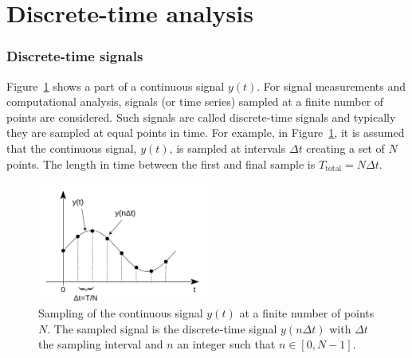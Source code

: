 \section{Discrete-time analysis}\label{app:discrete_time_analysis}

\subsubsection*{Discrete-time signals} %
Figure~\ref{fig:sampling_of_continuous_signal} shows a part of a continuous signal $y(t)$. For signal measurements and computational analysis, signals (or time series) sampled at a finite number of points are considered. Such signals are called discrete-time signals and typically they are sampled at equal points in time. For example, in Figure~\ref{fig:sampling_of_continuous_signal}, it is assumed that the continuous signal, $y(t)$, is sampled at intervals $\Delta t$ creating a set of $N$ points. The length in time between the first and final sample is $T_\mathrm{total} = N\Delta t$.


\begin{figure}[!ht]
     \centering         
     \includegraphics[width=0.5\textwidth]{./images/app_B/approximation_of_signal_by_sampling_v2.png}
         \caption{Sampling of the continuous signal $y(t)$ at a finite number of points $N$. The sampled signal is the discrete-time signal $y(n\Delta t)$ with $\Delta t$ the sampling interval and  $n$ an integer such that $n \in \left[0,N-1 \right ]$.}
         \label{fig:sampling_of_continuous_signal}
\end{figure}

